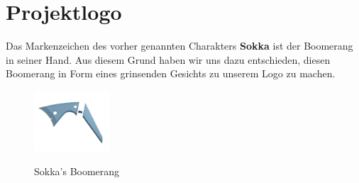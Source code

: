 \newpage

\section{Projektlogo}

Das Markenzeichen des vorher genannten Charakters \textbf{Sokka} ist der Boomerang in seiner Hand. Aus diesem Grund haben wir uns dazu entschieden, diesen Boomerang in Form eines grinsenden Gesichts zu unserem Logo zu machen.

\begin{figure}[H]
    \begin{center}
        \includegraphics[width=0.25\textwidth]{images/Intro/Boomerang.png}
        \caption{Sokka's Boomerang}
        \cite{aguilar2020}
    \end{center}
\end{figure}